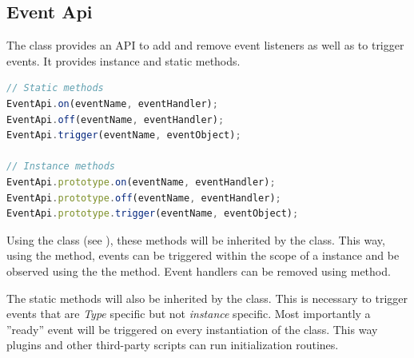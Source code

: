 


\subsection{Event Api}

The  class provides an API to add and remove event listeners as well as to trigger events. It provides instance and static methods.

\begin{lstlisting}[language=JavaScript, caption={EventApi methods}, label=lst:eventapi_methods]
// Static methods
EventApi.on(eventName, eventHandler);
EventApi.off(eventName, eventHandler);
EventApi.trigger(eventName, eventObject);

// Instance methods
EventApi.prototype.on(eventName, eventHandler);
EventApi.prototype.off(eventName, eventHandler);
EventApi.prototype.trigger(eventName, eventObject);
\end{lstlisting}


Using the  class (see ), these methods will be inherited by the  class. This way, using the  method, events can be triggered within the scope of a  instance and be observed using the  the  method. Event handlers can be removed using  method.

The static methods will also be inherited by the  class. This is necessary to trigger events that are \textit{Type} specific but not \textit{instance} specific. Most importantly a ''ready'' event will be triggered on every instantiation of the  class. This way plugins and other third-party scripts can run initialization routines.

